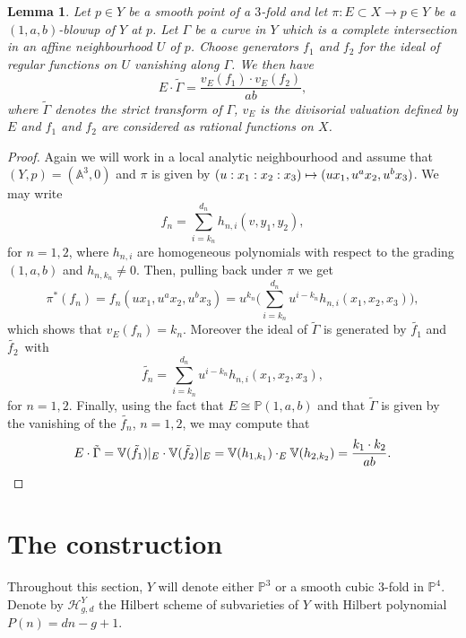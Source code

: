 \documentclass[JEP,XML,SOM,Unicode,published]{cedram}
\newcommand\mto{\mathchoice{\longmapsto}{\mapsto}{\mapsto}{\mapsto}}
\theoremstyle{plain}
\newtheorem{lemma}[theorem]{Lemma}
\theoremstyle{definition}
\newcommand{\PP}{\mathbb{P}}
\renewcommand{\AA}{\mathbb{A}}
\let\isom\cong
\begin{document}
\begin{lemma}\label{intersection with exceptional}
Let $p \in Y$ be a smooth point of a $3$-fold and let $\pi \colon E\subset X \to p \in Y$ be a $(1,a,b)$-blowup of $Y$ at $p$. Let $\Gamma$ be a curve in $Y$ which is a complete intersection in an affine neighbourhood $U$ of $p$. Choose generators $f_1$ and $f_2$ for the ideal of regular functions on $U$ vanishing along $\Gamma$. We then have
\[
E \cdot \tilde{\Gamma} = \frac{v_E(f_1)\cdot v_E(f_2)}{a b},
\]
where $\tilde{\Gamma}$ denotes the strict transform of $\Gamma$, $v_E$ is the divisorial valuation defined by $E$ and $f_1$ and $f_2$ are considered as rational functions on $X$.
\end{lemma}

\begin{proof}
Again we will work in a local analytic neighbourhood and assume that $(Y,p) = (\AA^3,0)$ and $\pi$ is given by $(u:x_1:x_2:x_3) \mto (ux_1,u^ax_2,u^bx_3)$.
We may write
\[
f_n = \sum_{i=k_n}^{d_n}h_{n,i}(v,y_1,y_2),
\]
for $n=1,2$, where $h_{n,i}$ are homogeneous polynomials with respect to the grading $(1,a,b)$ and $h_{n,k_n} \neq 0$.
Then, pulling back under $\pi$ we get
\[
\pi^*(f_n) = f_n(ux_1,u^a x_2,u^b x_3) = u^{k_n}\biggl( \sum_{i=k_n}^{d_n}u^{i-k_n} h_{n,i}(x_1,x_2,x_3)\biggr),
\]
which shows that $v_E(f_n) = k_n$.
Moreover the ideal of $\tilde{\Gamma}$ is generated by $\tilde{f_1}$ and $\tilde{f_2}$~with
\[
\tilde{f_n} = \sum_{i=k_n}^{d_n} u^{i-k_n} h_{n,i}(x_1,x_2,x_3),
\]
for $n=1,2$.
Finally, using the fact that $E \isom \PP(1,a,b)$ and that $\tilde{\Gamma}$ is given by the vanishing of the $\tilde{f_n}$, $n=1,2$, we may compute that
\[
E\cdot \tilde{\Gamma} = \mathbb{V}(\tilde{f_1})|_E \cdot \mathbb{V}(\tilde{f_2})|_E = \mathbb{V}(h_{1,k_1}) \cdot_{E} \mathbb{V}(h_{2,k_2}) = \frac{k_1\cdot k_2}{ab}.\qedhere
\]
\end{proof}

\section{The construction}

Throughout this section, $Y$ will denote either $\PP^3$ or a smooth cubic $3$-fold in $\PP^4$.
Denote by $\mathcal{H}_{g,d}^Y$ the Hilbert scheme of subvarieties of $Y$ with Hilbert polynomial $P(n) = dn - g +1$.
\end{document}
